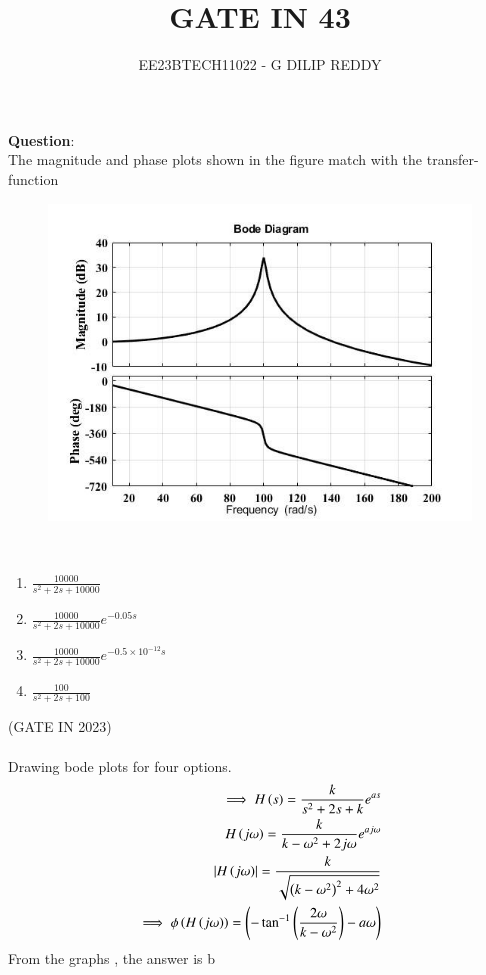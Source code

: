 \documentclass[journal,12pt,onecolumn]{IEEEtran}
\theoremstyle{remark}
\begin{document}

\vspace{3cm}

\title{GATE IN 43}
\author{EE23BTECH11022 - G DILIP REDDY}
\maketitle

\bigskip

\renewcommand{\thefigure}{\arabic{figure}}
\renewcommand{\thetable}{\arabic{table}}
\textbf{Question}:\\
The magnitude and phase plots shown in the figure match with the transfer-
function
\begin{figure}[h]
    \centering
    \includegraphics[width=\columnwidth]{figs/question.png}
\end{figure}\\
\renewcommand{\labelenumi}{\alph{enumi})}
\begin{enumerate}
\item $\frac{10000}{s^2+2s+10000}$\\
\item $\frac{10000}{s^2+2s+10000}e^{-0.05s}$\\
\item $\frac{10000}{s^2+2s+10000}e^{-0.5\times10^{-12}s}$\\
\item $\frac{100}{s^2+2s+100}$
\end{enumerate}
\hfill{(GATE IN 2023)}
\\\\
\solution
Drawing bode plots for four options.\\
\begin{align}
\implies H\left(s\right)=\frac{k}{s ^{2}+2s+k}e^{as}\\
H\left(j\omega\right)=\frac{k}{k-\omega ^2+2j\omega}e^{aj\omega}\\
\left\vert H\left(j\omega\right)\right\vert=\frac{k}{\sqrt{\left(k-\omega ^2\right)^2+4\omega^2}}\\
\implies \phi\left(H\left(j\omega\right)\right)=\left(-\tan^{-1}{\left(\frac{2\omega}{k-\omega^2}\right)-a\omega}\right)
\end{align}
From the graphs , the answer is b
\end{document}
